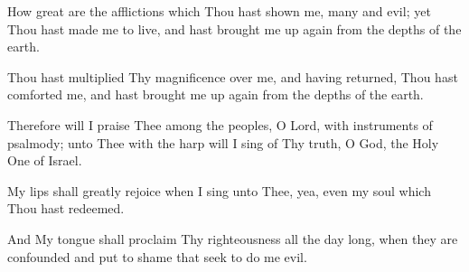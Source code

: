 How great are the afflictions which Thou hast shown me, many and evil; yet Thou hast made me to live, and hast brought me up again from the depths of the earth.

Thou hast multiplied Thy magnificence over me, and having returned, Thou hast comforted me, and hast brought me up again from the depths of the earth.

Therefore will I praise Thee among the peoples, O Lord, with instruments of psalmody; unto Thee with the harp will I sing of Thy truth, O God, the Holy One of Israel.

My lips shall greatly rejoice when I sing unto Thee, yea, even my soul which Thou hast redeemed.

And My tongue shall proclaim Thy righteousness all the day long, when they are confounded and put to shame that seek to do me evil.
